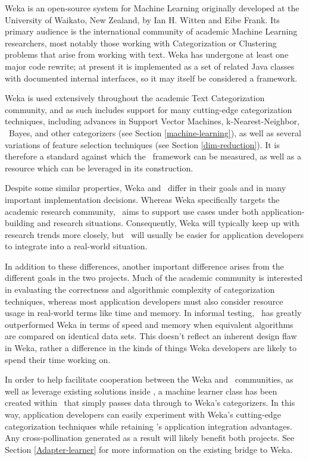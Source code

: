 Weka is an open-source system for Machine Learning originally
developed at the University of Waikato, New Zealand, by Ian H. Witten
and Eibe Frank. \cite{weka:99} Its primary
audience is the international community of academic Machine Learning
researchers, most notably those working with Categorization or
Clustering problems that arise from working with text.  Weka has
undergone at least one major code rewrite; at present it is
implemented as a set of related Java classes with documented internal
interfaces, so it may itself be considered a framework.

Weka is used extensively throughout the academic Text Categorization
community, and as such includes support for many cutting-edge
categorization techniques, including advances in Support Vector
Machines, k-Nearest-Neighbor, \naive\ Bayes, and other categorizers
(see Section \ref{machine-learning}), as well as several variations of
feature selection techniques (see Section \ref{dim-reduction}).  It is
therefore a standard against which the \aicat\ framework can
be measured, as well as a resource which can be leveraged in its
construction.

Despite some similar properties, Weka and \aicat\ differ in
their goals and in many important implementation decisions.  Whereas
Weka specifically targets the academic research community,
\aicat\ aims to support use cases under both
application-building and research situations.
Consequently, Weka will typically keep up with research trends more
closely, but \aicat\ will usually be easier for application
developers to integrate into a real-world situation.

In addition to these differences, another important difference arises
from the different goals in the two projects.  Much of the academic
community is interested in evaluating the correctness and algorithmic
complexity of categorization techniques, whereas most application
developers must also consider resource usage in real-world terms like
time and memory.  In informal testing, \aicat\ has greatly outperformed
Weka in terms of speed and memory when equivalent algorithms are
compared on identical data sets.  This doesn't reflect an inherent
design flaw in Weka, rather a difference in the kinds of things Weka
developers are likely to spend their time working on.

In order to help facilitate cooperation between the Weka and
\aicat\ communities, as well as leverage existing solutions
inside \aicat, a machine learner class has been created
within \aicat\ that simply passes data through to Weka's
categorizers.  In this way, application developers can easily
experiment with Weka's cutting-edge categorization techniques while
retaining \aicat's application integration advantages.  Any
cross-pollination generated as a result will likely benefit both
projects.  See Section \ref{Adapter-learner} for more information on
the existing bridge to Weka.

